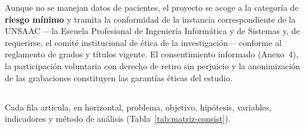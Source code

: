 \begin{bloqueObsCuatro}
\noindent Aunque no se manejan datos de pacientes, el proyecto se acoge a la categor{\'i}a de
\textbf{riesgo m{\'i}nimo} y tramita la conformidad de la instancia correspondiente de la UNSAAC
---la Escuela Profesional de Ingenier{\'i}a Inform{\'a}tica y de Sistemas y, de requerirse, el
comit{\'e} institucional de {\'e}tica de la investigaci{\'o}n--- conforme al reglamento de grados y
t{\'i}tulos vigente. El consentimiento informado (Anexo~4), la participaci{\'o}n voluntaria con
derecho de retiro sin perjuicio y la anonimizaci{\'o}n de las grabaciones constituyen las garant{\'i}as
{\'e}ticas del estudio.
\end{bloqueObsCuatro}

\begin{landscape}
\subsection{}
\begin{bloqueNuevo}
\noindent Cada fila articula, en horizontal, problema, objetivo, hip{\'o}tesis, variables, indicadores y m{\'e}todo de an{\'a}lisis (Tabla~\ref{tab:matriz-consist}).
\end{bloqueNuevo}
\vspace{1pt}

\label{tab:matriz-consist}

\setlength{\fboxsep}{6pt}%
\noindent{}
\vspace{2pt}


\end{landscape}
